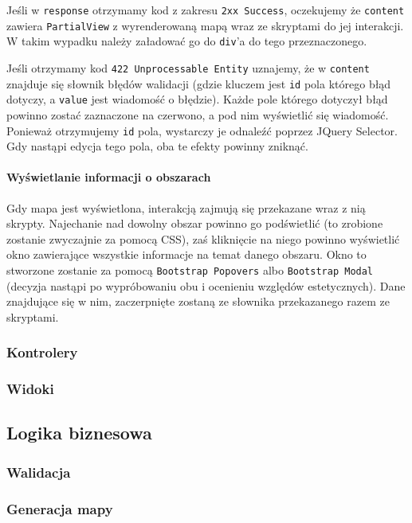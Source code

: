 \documentclass[a4paper, 10pt, titlepage]{article}
\newcommand{\code}[1]{\texttt{#1}}
\begin{document}
Jeśli w \code{response} otrzymamy kod z zakresu \code{2xx Success}, oczekujemy że \code{content} zawiera \code{PartialView} z wyrenderowaną mapą wraz ze skryptami do jej interakcji.
W takim wypadku należy załadować go do \code{div}'a do tego przeznaczonego.

Jeśli otrzymamy kod \code{422 Unprocessable Entity} uznajemy, że w \code{content} znajduje się słownik błędów walidacji (gdzie kluczem jest \code{id} pola którego błąd dotyczy, a \code{value} jest wiadomość o błędzie).
Każde pole którego dotyczył błąd powinno zostać zaznaczone na czerwono, a pod nim wyświetlić się wiadomość.
Ponieważ otrzymujemy \code{id} pola, wystarczy je odnaleźć poprzez JQuery Selector.
Gdy nastąpi edycja tego pola, oba te efekty powinny zniknąć.

\paragraph{Wyświetlanie informacji o obszarach}

Gdy mapa jest wyświetlona, interakcją zajmują się przekazane wraz z nią skrypty.
Najechanie nad dowolny obszar powinno go podświetlić (to zrobione zostanie zwyczajnie za pomocą CSS), zaś kliknięcie na niego powinno wyświetlić okno zawierające wszystkie informacje na temat danego obszaru.
Okno to stworzone zostanie za pomocą \code{Bootstrap Popovers} albo \code{Bootstrap Modal} (decyzja nastąpi po wypróbowaniu obu i ocenieniu względów estetycznych).
Dane znajdujące się w nim, zaczerpnięte zostaną ze słownika przekazanego razem ze skryptami.

\subsubsection{Kontrolery}

\subsubsection{Widoki}

\subsection{Logika biznesowa}

\subsubsection{Walidacja}

\subsubsection{Generacja mapy}
\end{document}
